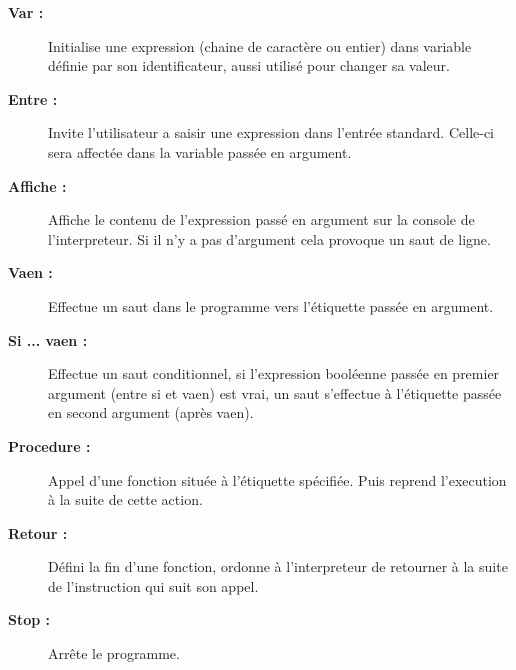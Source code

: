 \begin{description}
	\item [\textbf{Var :}] Initialise une expression (chaine de caractère ou entier) dans variable définie par son identificateur, aussi utilisé pour changer sa valeur.

	\item [\textbf{Entre :}] Invite l'utilisateur a saisir une expression dans l'entrée standard. Celle-ci sera affectée dans la variable passée en argument.

	\item [\textbf{Affiche :}] Affiche le contenu de l'expression passé en argument sur la console de l'interpreteur. Si il n'y a pas d'argument cela provoque un saut de ligne.

	\item [\textbf{Vaen :}] Effectue un saut dans le programme vers l'étiquette passée en argument.

	\item [\textbf{Si ... vaen :}] Effectue un saut conditionnel, si l'expression booléenne passée en premier argument (entre si et vaen) est vrai, un saut s'effectue à l'étiquette passée en second argument (après vaen). 

	\item [\textbf{Procedure :}] Appel d'une fonction située à l'étiquette spécifiée. Puis reprend l'execution à la suite de cette action.

	\item [\textbf{Retour :}] Défini la fin d'une fonction, ordonne à l'interpreteur de retourner à la suite de l'instruction qui suit son appel.

	\item [\textbf{Stop :}] Arrête le programme.

\end{description}